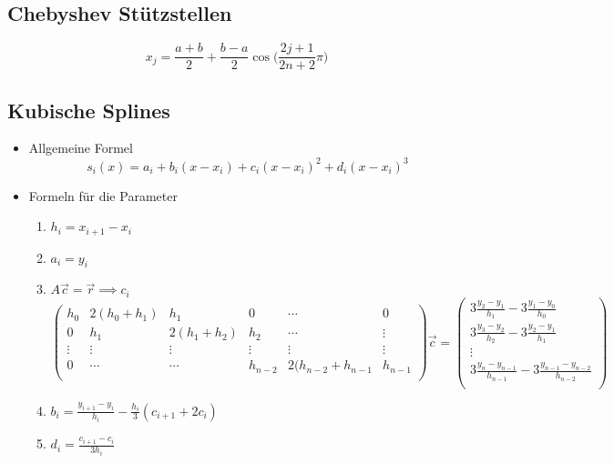 \subsection{Chebyshev Stützstellen}

\begin{equation*}
	x_j = \frac{a+b}{2} + \frac{b-a}{2} \cos\bigg(\frac{2j + 1}{2n + 2} \pi\bigg)
\end{equation*}

\subsection{Kubische Splines}

\begin{itemize}
	
	\item Allgemeine Formel \\
	\begin{equation*}
		s_i(x) = a_i + b_i (x - x_i) + c_i (x - x_i)^2 + d_i (x - x_i)^3
	\end{equation*}
	
	\item Formeln für die Parameter \\
	\begin{enumerate}
		\item $h_i = x_{i+1} - x_i$
		\item $a_i = y_i$
		\item $A\vec{c}=\vec{r} \implies c_i$
		\begin{displaymath}
			\begin{pmatrix}
				h_0		& 2(h_0 + h_1)	& h_1	& 0 		& \cdots	& 0 \\
				0		& h_1	& 2(h_1 + h_2)	& h_2		& \cdots	& \vdots \\
				\vdots	& \vdots	& \vdots	& \vdots	& \vdots	& \vdots \\
				0		& \cdots	& \cdots	& h_{n-2}	& 2(h_{n-2} + h_{n-1}	& h_{n-1} \\
			\end{pmatrix}
			\vec{c} = 
			\begin{pmatrix}
				3\frac{y_2-y_1}{h_1} - 3\frac{y_1-y_0}{h_0} \\
				3\frac{y_3-y_2}{h_2} - 3\frac{y_2-y_1}{h_1} \\
				\vdots \\
				3\frac{y_n-y_{n-1}}{h_{n-1}} - 3\frac{y_{n-1}-y_{n-2}}{h_{n-2}} \\
			\end{pmatrix}
		\end{displaymath}
		\item $b_i = \frac{y_{i+1} - y_i}{h_i} - \frac{h_i}{3} (c_{i+1} + 2c_i)$
		\item $d_i = \frac{c_{i+1} - c_i}{3 h_i}$
	\end{enumerate}
	

\end{itemize}
